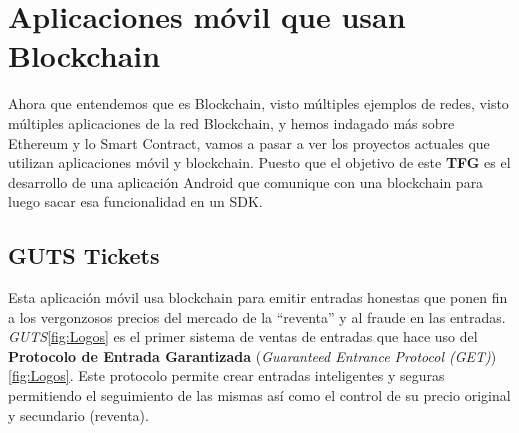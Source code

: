 \section{Aplicaciones móvil que usan Blockchain}

Ahora que entendemos que es Blockchain, visto múltiples ejemplos de redes, visto múltiples aplicaciones de la red Blockchain, y hemos indagado más sobre Ethereum y lo Smart Contract, vamos a pasar a ver los proyectos actuales que utilizan aplicaciones móvil y blockchain. Puesto que el objetivo de este \textbf{TFG} es el desarrollo de una aplicación Android que comunique con una blockchain para luego sacar esa funcionalidad en un SDK.

\subsection{GUTS Tickets}

Esta aplicación móvil usa blockchain para emitir entradas honestas que ponen fin a los vergonzosos precios del mercado de la ``reventa'' y al fraude en las entradas. \emph{GUTS}\ref{fig:Logos} es el primer sistema de ventas de entradas que hace uso del \textbf{Protocolo de Entrada Garantizada} {\small (\textit{Guaranteed Entrance Protocol (GET)})}\cite{GET}\ref{fig:Logos}. Este protocolo permite crear entradas inteligentes y seguras permitiendo el seguimiento de las mismas así como el control de su precio original y secundario (reventa). 

